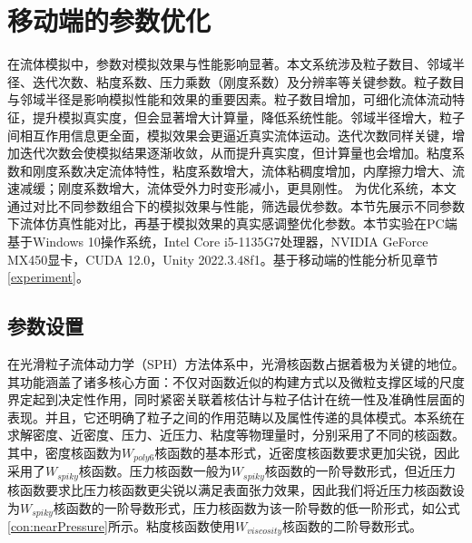 







\section{移动端的参数优化}

在流体模拟中，参数对模拟效果与性能影响显著。本文系统涉及粒子数目、邻域半径、迭代次数、粘度系数、压力乘数（刚度系数）及分辨率等关键参数。粒子数目与邻域半径是影响模拟性能和效果的重要因素。粒子数目增加，可细化流体流动特征，提升模拟真实度，但会显著增大计算量，降低系统性能。邻域半径增大，粒子间相互作用信息更全面，模拟效果会更逼近真实流体运动。迭代次数同样关键，增加迭代次数会使模拟结果逐渐收敛，从而提升真实度，但计算量也会增加。粘度系数和刚度系数决定流体特性，粘度系数增大，流体粘稠度增加，内摩擦力增大、流速减缓；刚度系数增大，流体受外力时变形减小，更具刚性。
为优化系统，本文通过对比不同参数组合下的模拟效果与性能，筛选最优参数。本节先展示不同参数下流体仿真性能对比，再基于模拟效果的真实感调整优化参数。本节实验在PC端基于Windows 10操作系统，Intel Core i5-1135G7处理器，NVIDIA GeForce MX450显卡，CUDA 12.0，Unity 2022.3.48f1。基于移动端的性能分析见章节\ref{experiment}。

\subsection{参数设置}

在光滑粒子流体动力学（SPH）方法体系中，光滑核函数占据着极为关键的地位。其功能涵盖了诸多核心方面：不仅对函数近似的构建方式以及微粒支撑区域的尺度界定起到决定性作用，同时紧密关联着核估计与粒子估计在统一性及准确性层面的表现。并且，它还明确了粒子之间的作用范畴以及属性传递的具体模式。本系统在求解密度、近密度、压力、近压力、粘度等物理量时，分别采用了不同的核函数。其中，密度核函数为$W_{poly6}$核函数的基本形式，近密度核函数要求更加尖锐，因此采用了$W_{spiky}$核函数。压力核函数一般为$W_{spiky}$核函数的一阶导数形式，但近压力核函数要求比压力核函数更尖锐以满足表面张力效果，因此我们将近压力核函数设为$W_{spiky}$核函数的一阶导数形式，压力核函数为该一阶导数的低一阶形式，如公式\eqref{con:nearPressure}所示。粘度核函数使用$W_{viscosity}$核函数的二阶导数形式。

